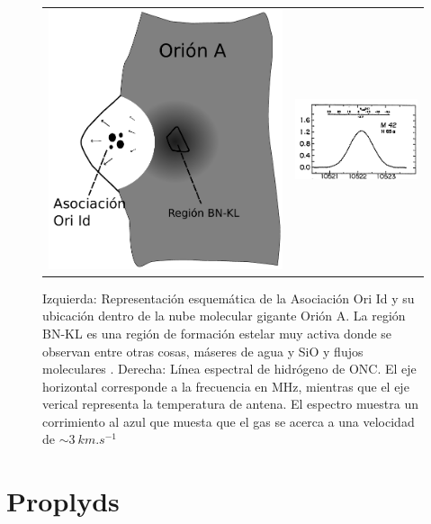\begin{figure}
  \centering
  \begin{tabular}{lr}
    \includegraphics[width=0.4\linewidth]{./Figures/champagne} &
    \includegraphics[width=0.5\linewidth]{./Figures/H85-alpha}
    \end{tabular}
  \caption{Izquierda: Representación esquemática de la Asociación Ori Id y su ubicación dentro de la nube molecular gigante Orión A. La región BN-KL es una región de formación estelar muy activa donde se observan entre otras cosas, máseres de agua y SiO y flujos moleculares \citep{Stahler:2004}. Derecha: Línea espectral  de hidrógeno de ONC. El eje horizontal corresponde a la frecuencia en MHz, mientras que el eje verical representa la temperatura de antena. El espectro muestra un corrimiento al azul que muesta que el gas se acerca a una velocidad de $\sim \SI{3}{km.s^{-1}}$ \citep{Stahler:2004, Churchwell:1970}}
  \label{fig:champagne}
\end{figure}

\section{Proplyds}
